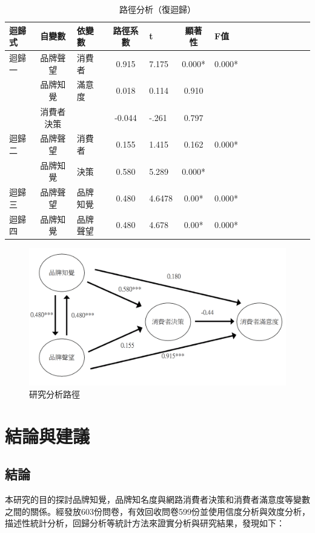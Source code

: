 \begin{table}[htb]
\caption{路徑分析（復迴歸）}
\label{tab:q1}
\centering
\renewcommand{\arraystretch}{1.2} %
\arrayrulewidth=1pt               %
\tabcolsep=10pt                   %
\begin{tabular}[t]{lclclclclclclcl}  %
\hline
 迴歸式&自變數&依變數&路徑系數&t&顯著性&F值\\
\hline
迴歸一 &品牌聲望&消費者&0.915&7.175&0.000*&0.000*\\
          &品牌知覺&滿意度&0.018&0.114&0.910& \\
          &消費者決策&      &-0.044&-.261&0.797& \\
\hline
迴歸二&品牌聲望&消費者&0.155&1.415&0.162&0.000* \\
          &品牌知覺&決策  &0.580&5.289&0.000*& \\
\hline
迴歸三&品牌聲望&品牌知覺&0.480&4.6478&0.00*&0.000* \\
\hline
迴歸四&品牌知覺&品牌聲望&0.480&4.678&0.00*&0.000* \\
\hline
\end{tabular}
\end{table}

\begin{figure}[h]
\centering
\includegraphics[width=14cm]{images/路徑分析.png}
\caption{研究分析路徑}
\label{fig:ARB}
\end{figure}

\chapter{結論與建議}

\section{結論}
本研究的目的探討品牌知覺，品牌知名度與網路消費者決策和消費者滿意度等變數之間的關係。經發放603份問卷，有效回收問卷599份並使用信度分析與效度分析，描述性統計分析，回歸分析等統計方法來證實分析與研究結果，發現如下：

